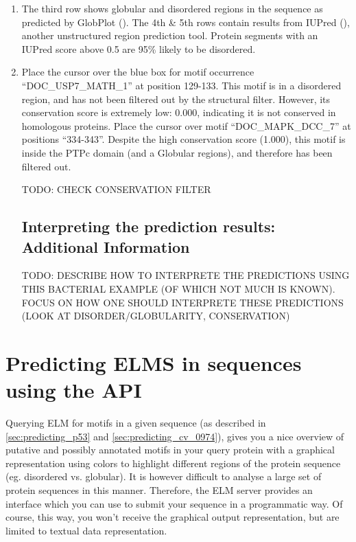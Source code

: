\documentclass[12pt]{article}
\begin{document}
\begin{enumerate}
\item The third row shows globular and disordered regions in the sequence as
	predicted by GlobPlot (\cite{12824398}). The 4th \& 5th rows contain
	results from IUPred (\cite{15955779}), another unstructured region
	prediction tool. Protein segments with an IUPred score above 0.5 are
	95\% likely to be disordered.  

\item Place the cursor over the blue box for motif occurrence
	``DOC\_USP7\_MATH\_1'' at position 129-133. This motif is in a
	disordered region, and has not been filtered out by the structural
	filter. However, its conservation score is extremely low: 0.000,
	indicating it is not conserved in homologous proteins. Place the cursor
	over motif ``DOC\_MAPK\_DCC\_7'' at positions ``334-343''. Despite the
	high conservation score (1.000), this motif is inside the PTPc domain
	(and a Globular regions), and therefore has been filtered out.

TODO: CHECK CONSERVATION FILTER

%
%
\subsection*{Interpreting the prediction results: Additional Information}
\label{subsec:predicting_cv_0974_additional_information}

TODO: DESCRIBE HOW TO INTERPRETE THE PREDICTIONS USING THIS BACTERIAL
EXAMPLE (OF WHICH NOT MUCH IS KNOWN). FOCUS ON HOW ONE SHOULD INTERPRETE
THESE PREDICTIONS (LOOK AT DISORDER/GLOBULARITY, CONSERVATION)

\end{enumerate}

\clearpage

\section{Predicting ELMS in sequences using the API}
\label{sec:predicting_REST}

Querying ELM for motifs in a given sequence (as described in
\ref{sec:predicting_p53} and \ref{sec:predicting_cv_0974}), gives you a nice
overview of putative and possibly
annotated motifs in your query protein with a graphical representation
using colors to highlight different regions of the protein sequence (eg.
disordered vs. globular). It is however difficult to analyse a large set
of protein sequences in this manner. Therefore, the ELM server
provides an interface which you can use to submit your sequence in a
programmatic way. Of course, this way, you won't receive the graphical
output representation, but are limited to textual data representation.
\end{document}
